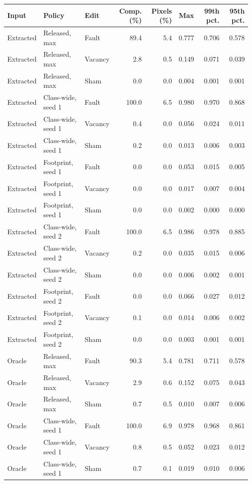\begin{tabular}{lllrrrrr}
\toprule
Input & Policy & Edit & Comp. (\%) & Pixels (\%) & Max & 99th pct. & 95th pct. \\
\midrule
Extracted & Released, max & Fault & 89.4 & 5.4 & 0.777 & 0.706 & 0.578 \\
Extracted & Released, max & Vacancy & 2.8 & 0.5 & 0.149 & 0.071 & 0.039 \\
Extracted & Released, max & Sham & 0.0 & 0.0 & 0.004 & 0.001 & 0.001 \\
Extracted & Class-wide, seed 1 & Fault & 100.0 & 6.5 & 0.980 & 0.970 & 0.868 \\
Extracted & Class-wide, seed 1 & Vacancy & 0.4 & 0.0 & 0.056 & 0.024 & 0.011 \\
Extracted & Class-wide, seed 1 & Sham & 0.2 & 0.0 & 0.013 & 0.006 & 0.003 \\
Extracted & Footprint, seed 1 & Fault & 0.0 & 0.0 & 0.053 & 0.015 & 0.005 \\
Extracted & Footprint, seed 1 & Vacancy & 0.0 & 0.0 & 0.017 & 0.007 & 0.004 \\
Extracted & Footprint, seed 1 & Sham & 0.0 & 0.0 & 0.002 & 0.000 & 0.000 \\
Extracted & Class-wide, seed 2 & Fault & 100.0 & 6.5 & 0.986 & 0.978 & 0.885 \\
Extracted & Class-wide, seed 2 & Vacancy & 0.2 & 0.0 & 0.035 & 0.015 & 0.006 \\
Extracted & Class-wide, seed 2 & Sham & 0.0 & 0.0 & 0.006 & 0.002 & 0.001 \\
Extracted & Footprint, seed 2 & Fault & 0.0 & 0.0 & 0.066 & 0.027 & 0.012 \\
Extracted & Footprint, seed 2 & Vacancy & 0.1 & 0.0 & 0.014 & 0.006 & 0.002 \\
Extracted & Footprint, seed 2 & Sham & 0.0 & 0.0 & 0.003 & 0.001 & 0.001 \\
\midrule
Oracle & Released, max & Fault & 90.3 & 5.4 & 0.781 & 0.711 & 0.578 \\
Oracle & Released, max & Vacancy & 2.9 & 0.6 & 0.152 & 0.075 & 0.043 \\
Oracle & Released, max & Sham & 0.7 & 0.5 & 0.010 & 0.007 & 0.006 \\
Oracle & Class-wide, seed 1 & Fault & 100.0 & 6.9 & 0.978 & 0.968 & 0.861 \\
Oracle & Class-wide, seed 1 & Vacancy & 0.8 & 0.5 & 0.052 & 0.023 & 0.012 \\
Oracle & Class-wide, seed 1 & Sham & 0.7 & 0.1 & 0.019 & 0.010 & 0.006 \\

\end{tabular}
